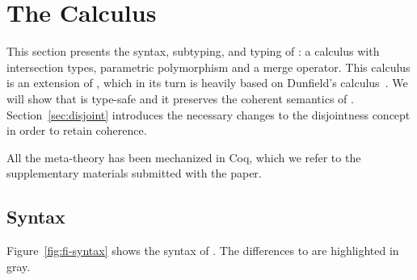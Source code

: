 \section{The \name Calculus}
\label{sec:fi}

This section presents the syntax, subtyping, and typing of \name: 
a calculus with intersection types, parametric polymorphism and a merge operator. 
This calculus is an extension of \oldname, which in its turn is heavily based
on Dunfield's calculus~\cite{dunfield2014elaborating}. 
We will show that \name is type-safe and it preserves the coherent semantics of
\oldname.
Section~\ref{sec:disjoint} introduces the necessary changes to the disjointness
concept in order to retain coherence.

All the meta-theory has been mechanized in Coq, which we refer to the supplementary
materials submitted with the paper.

\subsection{Syntax}

Figure~\ref{fig:fi-syntax} shows the syntax of \name. 
The differences to \oldname are highlighted in gray.


